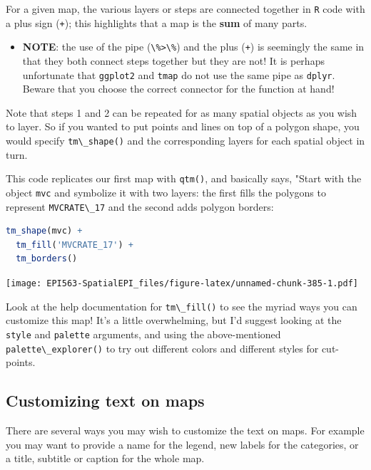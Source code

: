 \documentclass[
]{book}
\newcommand{\passthrough}[1]{#1}
\newenvironment{rmdblock}[1]
  {%
  \begin{itemize}
  \renewcommand{\labelitemi}{
    \raisebox{-.7\height}[0pt][0pt]{
      {\setkeys{Gin}{width=3em,keepaspectratio}\texttt{[image: images/\#1]}}
    }
  }
  \item
  }
  {
  \end{itemize}
  }
\newenvironment{rmdcaution}
  {\begin{rmdblock}{caution}}
  {\end{rmdblock}}
\begin{document}
For a given map, the various layers or steps are connected together in \passthrough{\lstinline!R!} code with a plus sign (\passthrough{\lstinline!+!}); this highlights that a map is the \textbf{sum} of many parts.

\begin{rmdcaution}
\textbf{NOTE}: the use of the pipe (\passthrough{\lstinline!\%>\%!}) and the plus (\passthrough{\lstinline!+!}) is seemingly the same in that they both connect steps together but they are not! It is perhaps unfortunate that \passthrough{\lstinline!ggplot2!} and \passthrough{\lstinline!tmap!} do not use the same pipe as \passthrough{\lstinline!dplyr!}. Beware that you choose the correct connector for the function at hand!
\end{rmdcaution}

Note that steps 1 and 2 can be repeated for as many spatial objects as you wish to layer. So if you wanted to put points and lines on top of a polygon shape, you would specify \passthrough{\lstinline!tm\_shape()!} and the corresponding layers for each spatial object in turn.

This code replicates our first map with \passthrough{\lstinline!qtm()!}, and basically says, "Start with the object \passthrough{\lstinline!mvc!} and symbolize it with two layers: the first fills the polygons to represent \passthrough{\lstinline!MVCRATE\_17!} and the second adds polygon borders:

\begin{lstlisting}[language=R]
tm_shape(mvc) +
  tm_fill('MVCRATE_17') +
  tm_borders()
\end{lstlisting}

\texttt{[image: EPI563-SpatialEPI\_files/figure-latex/unnamed-chunk-385-1.pdf]}

Look at the help documentation for \passthrough{\lstinline!tm\_fill()!} to see the myriad ways you can customize this map! It's a little overwhelming, but I'd suggest looking at the \passthrough{\lstinline!style!} and \passthrough{\lstinline!palette!} arguments, and using the above-mentioned \passthrough{\lstinline!palette\_explorer()!} to try out different colors and different styles for cut-points.

\hypertarget{customizing-text-on-maps}{%
\subsection{Customizing text on maps}\label{customizing-text-on-maps}}

There are several ways you may wish to customize the text on maps. For example you may want to provide a name for the legend, new labels for the categories, or a title, subtitle or caption for the whole map.
\end{document}
